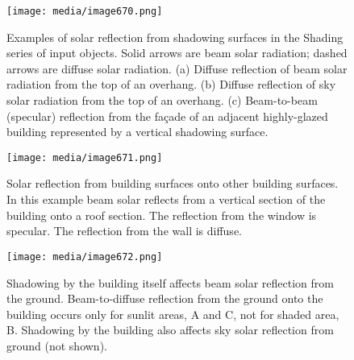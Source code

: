 \begin{figure}[hbtp] %
\centering
\texttt{[image: media/image670.png]}
\caption{Examples of solar reflection from shadowing surfaces in the Shading series of input objects. Solid arrows are beam solar radiation; dashed arrows are diffuse solar radiation. (a) Diffuse reflection of beam solar radiation from the top of an overhang. (b) Diffuse reflection of sky solar radiation from the top of an overhang. (c) Beam-to-beam (specular) reflection from the façade of an adjacent highly-glazed building represented by a vertical shadowing surface. \protect \label{fig:examples-of-solar-reflection-from-shadowing}}
\end{figure}

\begin{figure}[hbtp] %
\centering
\texttt{[image: media/image671.png]}
\caption{Solar reflection from building surfaces onto other building surfaces. In this example beam solar reflects from a vertical section of the building onto a roof section. The reflection from the window is specular. The reflection from the wall is diffuse. \protect \label{fig:solar-reflection-from-building-surfaces-onto}}
\end{figure}

\begin{figure}[hbtp] %
\centering
\texttt{[image: media/image672.png]}
\caption{Shadowing by the building itself affects beam solar reflection from the ground. Beam-to-diffuse reflection from the ground onto the building occurs only for sunlit areas, A and C, not for shaded area, B. Shadowing by the building also affects sky solar reflection from ground (not shown). \protect \label{fig:shadowing-by-the-building-itself-affects-beam}}
\end{figure}
